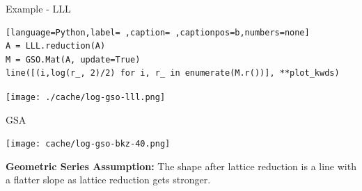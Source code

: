 \documentclass[table,10pt,aspectratio=169]{beamer}
\begin{document}
\begin{frame}[label={sec:orgf719841},fragile]{Example - LLL}
 \begin{lstlisting}[language=Python,label= ,caption= ,captionpos=b,numbers=none]
A = LLL.reduction(A)
M = GSO.Mat(A, update=True)
line([(i,log(r_, 2)/2) for i, r_ in enumerate(M.r())], **plot_kwds)
\end{lstlisting}

\begin{center}
\texttt{[image: ./cache/log-gso-lll.png]}
\end{center}
\end{frame}

\begin{frame}[label={sec:org3b25ad7}]{GSA}
\begin{center}
\texttt{[image: cache/log-gso-bkz-40.png]}
\end{center}

\textbf{Geometric Series Assumption:} The shape after lattice reduction is a line with a flatter slope as lattice reduction gets stronger.
\end{frame}
\end{document}
